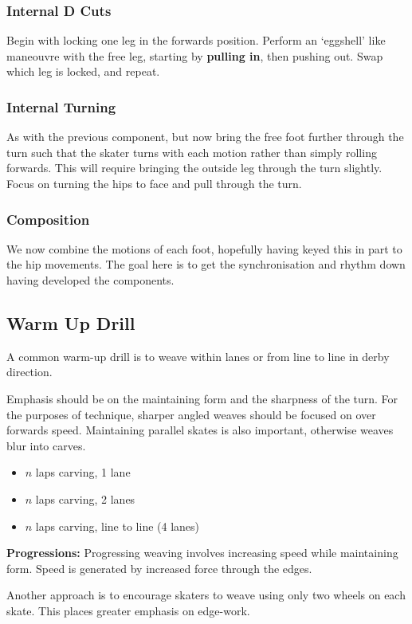 \subsubsection*{Internal D Cuts}
Begin with locking one leg in the forwards position.
Perform an `eggshell' like maneouvre with the free leg, starting by {\bf pulling in}, then pushing out.
Swap which leg is locked, and repeat.

\subsubsection*{Internal Turning}
As with the previous component, but now bring the free foot further through the turn such that the skater turns with each motion rather than simply rolling forwards. This will require bringing the outside leg through the turn slightly.    
Focus on turning the hips to face and pull through the turn.

\subsubsection*{Composition}
We now combine the motions of each foot, hopefully having keyed this in part to the hip movements.   
The goal here is to get the synchronisation and rhythm down having developed the components. 


\subsection*{Warm Up Drill}
\label{drill:sticky/weaves/warm_up}

A common warm-up drill is to weave within lanes or from line to line in derby direction.

Emphasis should be on the maintaining form and the sharpness of the turn. 
For the purposes of technique, sharper angled weaves should be focused on over forwards speed.
Maintaining parallel skates is also important, otherwise weaves blur into carves. 

\begin{itemize}
\item $n$ laps carving, 1 lane 
\item $n$ laps carving, 2 lanes
\item $n$ laps carving, line to line (4 lanes)
\end{itemize}


{\bf Progressions:}
Progressing weaving involves increasing speed while maintaining form.   
Speed is generated by increased force through the edges.  

Another approach is to encourage skaters to weave using only two wheels on each skate. This places greater emphasis on edge-work. 
